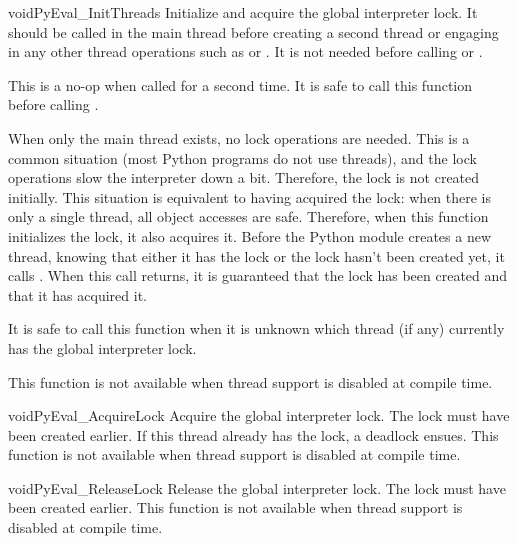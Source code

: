 \begin{cfuncdesc}{void}{PyEval_InitThreads}{}
  Initialize and acquire the global interpreter lock.  It should be
  called in the main thread before creating a second thread or
  engaging in any other thread operations such as
   or
  .
  It is not needed before calling
   or
  .

  This is a no-op when called for a second time.  It is safe to call
  this function before calling
  .

  When only the main thread exists, no lock operations are needed.
  This is a common situation (most Python programs do not use
  threads), and the lock operations slow the interpreter down a bit.
  Therefore, the lock is not created initially.  This situation is
  equivalent to having acquired the lock: when there is only a single
  thread, all object accesses are safe.  Therefore, when this function
  initializes the lock, it also acquires it.  Before the Python
   module creates a new thread,
  knowing that either it has the lock or the lock hasn't been created
  yet, it calls .  When this call
  returns, it is guaranteed that the lock has been created and that it
  has acquired it.

  It is  safe to call this function when it is unknown
  which thread (if any) currently has the global interpreter lock.

  This function is not available when thread support is disabled at
  compile time.
\end{cfuncdesc}

\begin{cfuncdesc}{void}{PyEval_AcquireLock}{}
  Acquire the global interpreter lock.  The lock must have been
  created earlier.  If this thread already has the lock, a deadlock
  ensues.  This function is not available when thread support is
  disabled at compile time.
\end{cfuncdesc}

\begin{cfuncdesc}{void}{PyEval_ReleaseLock}{}
  Release the global interpreter lock.  The lock must have been
  created earlier.  This function is not available when thread support
  is disabled at compile time.
\end{cfuncdesc}

